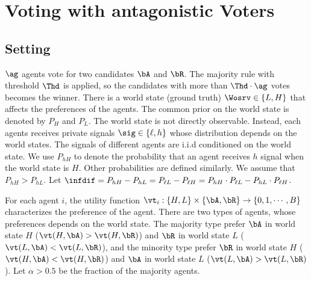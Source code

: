 \section{Voting with antagonistic Voters}
\subsection{Setting}
$\ag$ agents vote for two candidates $\bA$ and $\bR$. The majority rule with threshold $\Thd$ is applied, so the candidates with more than $\Thd \cdot \ag$ votes becomes the winner. There is a world state (ground truth) $\Wosrv \in \{L, H\}$ that affects the preferences of the agents. The common prior on the world state is denoted by $P_H$ and $P_L$. The world state is not directly observable. Instead, each agents receives private signals $\sig \in \{\ell, h\}$ whose distribution depends on the world states. The signals of different agents are i.i.d conditioned on the world state. We use $P_{hH}$ to denote the probability that an agent receives $h$ signal when the world state is $H$. Other probabilities are defined similarly. We assume that $P_{hH} > P_{hL}$. Let $\infdif = P_{hH} - P_{hL} = P_{\ell L} - P_{\ell H} = P_{hH}\cdot P_{\ell L} - P_{hL}\cdot P_{\ell H}$. 

For each agent $i$, the utility function $\vt_i: \{H, L\}\times \{\bA, \bR\} \to \{0, 1, \cdots, B\}$ characterizes the preference of the agent. There are two types of agents, whose preferences depends on the world state. The majority type prefer $\bA$ in world state $H$ ($\vt(H,\bA) > \vt(H, \bR)$) and $\bR$ in world state $L$ ($\vt(L,\bA) < \vt(L, \bR)$), and the minority type prefer $\bR$ in world state $H$ ($\vt(H,\bA) < \vt(H, \bR)$) and $\bA$ in world state $L$ ($\vt(L,\bA) > \vt(L, \bR)$). Let $\alpha > 0.5$ be the fraction of the majority agents.


